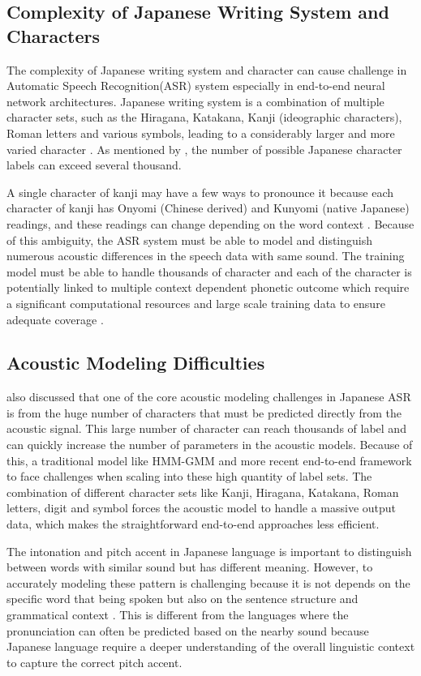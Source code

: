 \subsection{Complexity of Japanese Writing System and Characters}
The complexity of Japanese writing system and character can cause challenge in Automatic Speech Recognition(ASR) system especially in end-to-end neural network architectures. Japanese writing system is a combination of multiple character sets, such as the Hiragana, Katakana, Kanji (ideographic characters), Roman letters and various symbols, leading to a considerably larger and more varied character \parencite{rose2019unique}. As mentioned by \textcite{Ito2016End-to-end,ito2017}, the number of possible Japanese character labels can exceed several thousand.

A single character of kanji may have a few ways to pronounce it because each character of kanji has Onyomi (Chinese derived) and Kunyomi (native Japanese) readings, and these readings can change depending on the word context \parencite{curtin2020japanese}. Because of this ambiguity, the ASR system must be able to model and distinguish numerous acoustic differences in the speech data with same sound. The training model must be able to handle thousands of character and each of the character is potentially linked to multiple context dependent phonetic outcome which require a significant computational resources and large scale training data to ensure adequate coverage \parencite{Ito2016End-to-end,ito2017}.


\subsection{Acoustic Modeling Difficulties}
\textcite{ito2017} also discussed that one of the core acoustic modeling challenges in Japanese ASR is from the huge number of characters that must be predicted directly from the acoustic signal. This large number of character can reach thousands of label and can quickly increase the number of parameters in the acoustic models. Because of this, a traditional model like HMM-GMM and more recent end-to-end framework to face challenges when scaling into these high quantity of label sets. The combination of different character sets like Kanji, Hiragana, Katakana, Roman letters, digit and symbol forces the acoustic model to handle a massive output data, which makes the straightforward end-to-end approaches less efficient\parencite{glasmachers17a}. 

The intonation and pitch accent in Japanese language is important to distinguish between words with similar sound but has different meaning. However, to accurately modeling these pattern is challenging because it is not depends on the specific word that being spoken but also on the sentence structure and grammatical context \parencite{yasuda2022}. This is different from the languages where the pronunciation can often be predicted based on the nearby sound because Japanese language require a deeper understanding of the overall linguistic context to capture the correct pitch accent.



